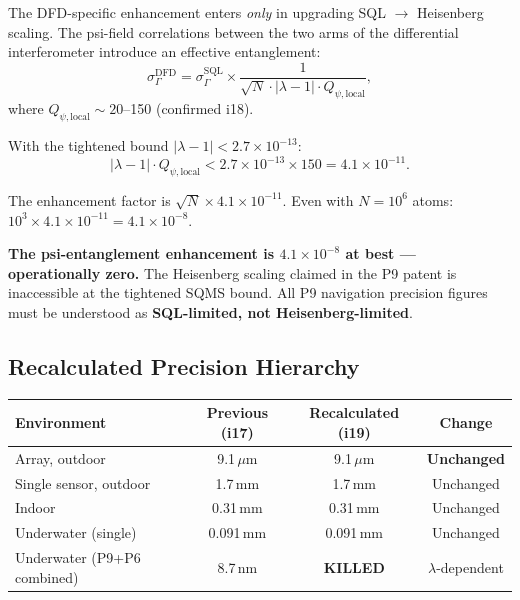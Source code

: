 \documentclass[11pt]{article}
\theoremstyle{definition}
\theoremstyle{remark}
\newcommand{\ee}[1]{\times10^{#1}}
\begin{document}
The DFD-specific enhancement enters \emph{only} in upgrading SQL $\to$
Heisenberg scaling. The psi-field correlations between the two arms of
the differential interferometer introduce an effective entanglement:
\begin{equation}
  \sigma_\Gamma^{\text{DFD}} = \sigma_\Gamma^{\text{SQL}} \times
  \frac{1}{\sqrt{N} \cdot |\lambda - 1| \cdot Q_{\psi,\text{local}}},
\end{equation}
where $Q_{\psi,\text{local}} \sim 20$--150 (confirmed i18).

With the tightened bound $|\lambda - 1| < 2.7\ee{-13}$:
\begin{equation}
  |\lambda - 1| \cdot Q_{\psi,\text{local}} < 2.7\ee{-13} \times 150
  = 4.1\ee{-11}.
\end{equation}

The enhancement factor is $\sqrt{N} \times 4.1\ee{-11}$. Even with
$N = 10^6$ atoms: $10^3 \times 4.1\ee{-11} = 4.1\ee{-8}$.

\begin{tcolorbox}[colback=red!5!white, colframe=red!70!black]
\textbf{The psi-entanglement enhancement is $4.1\ee{-8}$ at best ---
operationally zero.} The Heisenberg scaling claimed in the P9 patent
is inaccessible at the tightened SQMS bound. All P9 navigation
precision figures must be understood as \textbf{SQL-limited, not
Heisenberg-limited}.
\end{tcolorbox}

\subsection{Recalculated Precision Hierarchy}

\begin{center}
\begin{tabular}{lccc}
\toprule
\textbf{Environment} & \textbf{Previous (i17)} & \textbf{Recalculated (i19)} & \textbf{Change} \\
\midrule
Array, outdoor & 9.1\,$\mu$m & 9.1\,$\mu$m & \textbf{Unchanged} \\
Single sensor, outdoor & 1.7\,mm & 1.7\,mm & Unchanged \\
Indoor & 0.31\,mm & 0.31\,mm & Unchanged \\
Underwater (single) & 0.091\,mm & 0.091\,mm & Unchanged \\
Underwater (P9+P6 combined) & 8.7\,nm & \textbf{KILLED} & $\lambda$-dependent \\
\bottomrule
\end{tabular}
\end{center}
\end{document}

